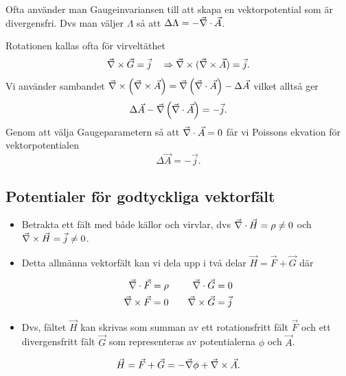 \documentclass[%
oneside,                 %
final,                   %
10pt]{article}
\newenvironment{warning_mdfboxadmon}[1][]{
\begin{warning_mdfboxmdframed}[frametitle=#1]
}
{
\end{warning_mdfboxmdframed}
}
\begin{document}
\begin{warning_mdfboxadmon}[Kommentar]
Ofta använder man Gaugeinvariansen till att skapa en vektorpotential som är divergensfri. Dvs man väljer $\Lambda$ så att $\Delta \Lambda = -\vec{\nabla} \cdot \vec{A}$.
\end{warning_mdfboxadmon} %



Rotationen kallas ofta för virveltäthet
$$
\vec{\nabla} \times \vec{G} = \vec{j} \quad \Rightarrow \vec{\nabla} \times (\vec{\nabla} \times \vec{A}) = \vec{j}.
$$
Vi använder sambandet $\vec{\nabla} \times \left( \vec{\nabla} \times \vec{A} \right) = \vec{\nabla} \left( \vec{\nabla} \cdot \vec{A} \right) - \Delta \vec{A}$ vilket alltså ger
$$
\Delta \vec{A} - \vec{\nabla} \left( \vec{\nabla} \cdot \vec{A} \right) = -\vec{j}.
$$
Genom att välja Gaugeparametern så att $\vec{\nabla} \cdot \vec{A} = 0$ får vi Poissons ekvation för vektorpotentialen
\begin{equation}
\Delta \vec{A} = -\vec{j}.
\end{equation}

\subsection*{Potentialer för godtyckliga vektorfält}

\begin{itemize}
\item Betrakta ett fält med både källor och virvlar, dvs $\vec{\nabla} \cdot \vec{H} = \rho \neq 0$ och $\vec{\nabla} \times \vec{H} = \vec{j} \neq 0$.

\item Detta allmänna vektorfält kan vi dela upp i två delar $\vec{H} = \vec{F} + \vec{G}$ där
\end{itemize}

\noindent
\begin{align}
\vec{\nabla} \cdot \vec{F} &= \rho \quad  &\vec{\nabla} \cdot \vec{G} &= 0 \\
\vec{\nabla} \times \vec{F} &= 0 \quad  &\vec{\nabla} \times \vec{G} &= \vec{j}
\end{align}

\begin{itemize}
\item Dvs, fältet $\vec{H}$ kan skrivas som summan av ett rotationsfritt fält $\vec{F}$ och ett divergensfritt fält $\vec{G}$ som representeras av potentialerna $\phi$ och $\vec{A}$.
\end{itemize}

\noindent
$$
\vec{H} = \vec{F} + \vec{G} = -\vec{\nabla} \phi + \vec{\nabla} \times \vec{A}.
$$
\end{document}
